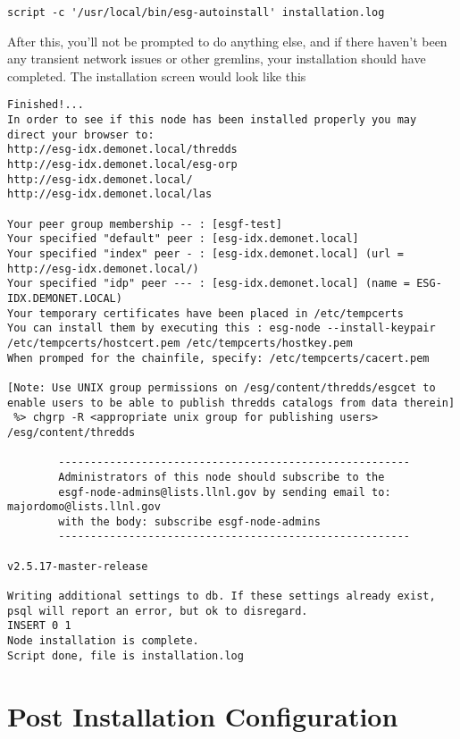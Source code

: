 \begin{verbatim}
script -c '/usr/local/bin/esg-autoinstall' installation.log
\end{verbatim}

After this, you'll not be prompted to do anything else, and if there
haven't been any transient network issues or other gremlins, your
installation should have completed. The installation screen would look
like this

\begin{verbatim}
Finished!...
In order to see if this node has been installed properly you may direct your browser to:
http://esg-idx.demonet.local/thredds
http://esg-idx.demonet.local/esg-orp
http://esg-idx.demonet.local/
http://esg-idx.demonet.local/las

Your peer group membership -- : [esgf-test]
Your specified "default" peer : [esg-idx.demonet.local]
Your specified "index" peer - : [esg-idx.demonet.local] (url = http://esg-idx.demonet.local/)
Your specified "idp" peer --- : [esg-idx.demonet.local] (name = ESG-IDX.DEMONET.LOCAL)
Your temporary certificates have been placed in /etc/tempcerts
You can install them by executing this : esg-node --install-keypair /etc/tempcerts/hostcert.pem /etc/tempcerts/hostkey.pem
When promped for the chainfile, specify: /etc/tempcerts/cacert.pem

[Note: Use UNIX group permissions on /esg/content/thredds/esgcet to enable users to be able to publish thredds catalogs from data therein]
 %> chgrp -R <appropriate unix group for publishing users> /esg/content/thredds

        -------------------------------------------------------
        Administrators of this node should subscribe to the
        esgf-node-admins@lists.llnl.gov by sending email to: majordomo@lists.llnl.gov
        with the body: subscribe esgf-node-admins
        -------------------------------------------------------

v2.5.17-master-release

Writing additional settings to db. If these settings already exist, psql will report an error, but ok to disregard.
INSERT 0 1
Node installation is complete.
Script done, file is installation.log
\end{verbatim}

\section{Post Installation
Configuration}\label{post-installation-configuration}
